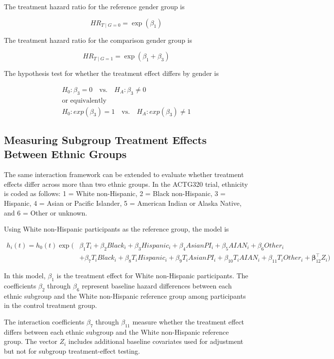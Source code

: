 \documentclass[
  letterpaper,
  DIV=11,
  numbers=noendperiod]{scrartcl}
\begin{document}
The treatment hazard ratio for the reference gender group is

\[
HR_{T \mid G = 0} = \exp(\beta_1)
\]

The treatment hazard ratio for the comparison gender group is

\[
HR_{T \mid G = 1} = \exp(\beta_1 + \beta_3)
\]

The hypothesis test for whether the treatment effect differs by gender
is

\[
\begin{gathered}
H_0 : \beta_3 = 0 \quad \text{vs.} \quad H_A : \beta_3 \neq 0 \\
\text{or equivalently} \\
H_0 : exp(\beta_3) = 1 \quad \text{vs.} \quad H_A : exp(\beta_3) \neq 1
\end{gathered}
\]

\subsection{Measuring Subgroup Treatment Effects Between Ethnic
Groups}\label{measuring-subgroup-treatment-effects-between-ethnic-groups}

The same interaction framework can be extended to evaluate whether
treatment effects differ across more than two ethnic groups. In the
ACTG320 trial, ethnicity is coded as follows: 1 = White non-Hispanic, 2
= Black non-Hispanic, 3 = Hispanic, 4 = Asian or Pacific Islander, 5 =
American Indian or Alaska Native, and 6 = Other or unknown.

Using White non-Hispanic participants as the reference group, the model
is

\[
\begin{aligned}
h_i(t) = h_0(t)\exp\big(&
\beta_1 T_i
+ \beta_2 Black_i
+ \beta_3 Hispanic_i
+ \beta_4 AsianPI_i
+ \beta_5 AIAN_i
+ \beta_6 Other_i \\
&+ \beta_7 T_iBlack_i
+ \beta_8 T_iHispanic_i
+ \beta_9 T_iAsianPI_i
+ \beta_{10} T_iAIAN_i
+ \beta_{11} T_iOther_i
+ \boldsymbol{\beta}_{12}^{\top}Z_i
\big)
\end{aligned}
\]

In this model, \(\beta_1\) is the treatment effect for White
non-Hispanic participants. The coefficients \(\beta_2\) through
\(\beta_6\) represent baseline hazard differences between each ethnic
subgroup and the White non-Hispanic reference group among participants
in the control treatment group.

The interaction coefficients \(\beta_7\) through \(\beta_{11}\) measure
whether the treatment effect differs between each ethnic subgroup and
the White non-Hispanic reference group. The vector \(Z_i\) includes
additional baseline covariates used for adjustment but not for subgroup
treatment-effect testing.
\end{document}

